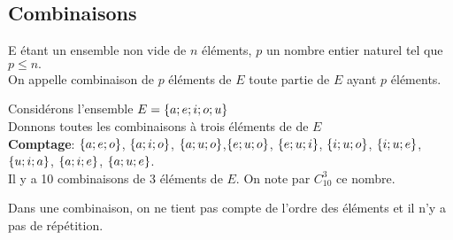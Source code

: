 \subsection{Combinaisons}
\begin{definition}
E étant un ensemble non vide de $ n $ éléments, $ p $ un nombre entier naturel tel que $ p\leq n. $\\
On appelle combinaison de $ p $ éléments de $ E $ toute partie de $ E $ ayant $ p $ éléments.
\end{definition}
\begin{example}
Considérons l'ensemble $ E=\left\{a; e; i; o; u\right\} $\\
Donnons toutes les combinaisons  à trois éléments de  de $ E $\\
\textbf{Comptage}: $ \left\{a; e; o\right\} $,  $ \left\{a; i; o\right\} $, $ \left\{a; u; o\right\} $,$ \left\{e; u; o\right\} $, $ \left\{e; u; i\right\} $, $ \left\{i; u; o\right\} $, $ \left\{i; u; e\right\} $, $ \left\{u; i; a\right\} $,  $ \left\{a; i; e\right\} $, $ \left\{a; u; e\right\} $.\\
Il y a 10 combinaisons de 3 éléments de $ E. $ On note par $ C_{10}^{3} $ ce nombre.
\end{example}
\begin{remark}
Dans une combinaison, on ne tient pas compte de l'ordre des éléments et il n'y a pas de répétition.
\end{remark}
